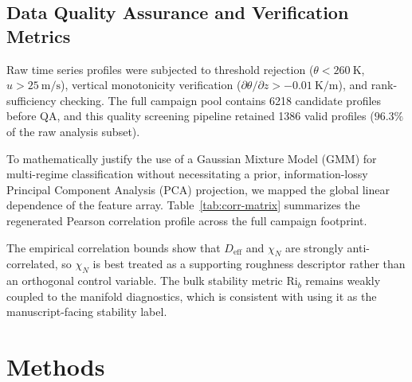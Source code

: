 \documentclass[11pt,a4paper]{article}
\begin{document}
\subsection{Data Quality Assurance and Verification Metrics}

Raw time series profiles were subjected to threshold rejection ($\theta < \SI{260}{\kelvin}$, $u > \SI{25}{\meter\per\second}$), vertical monotonicity verification ($\partial \theta / \partial z > -\SI{0.01}{\kelvin\per\meter}$), and rank-sufficiency checking. The full campaign pool contains 6218 candidate profiles before QA, and this quality screening pipeline retained 1386 valid profiles ($96.3\%$ of the raw analysis subset).

To mathematically justify the use of a Gaussian Mixture Model (GMM) for multi-regime classification without necessitating a prior, information-lossy Principal Component Analysis (PCA) projection, we mapped the global linear dependence of the feature array. Table~\ref{tab:corr-matrix} summarizes the regenerated Pearson correlation profile across the full campaign footprint.


The empirical correlation bounds show that $D_{\mathrm{eff}}$ and $\chi_N$ are strongly anti-correlated, so $\chi_N$ is best treated as a supporting roughness descriptor rather than an orthogonal control variable. The bulk stability metric $\mathrm{Ri}_b$ remains weakly coupled to the manifold diagnostics, which is consistent with using it as the manuscript-facing stability label.

 \section{Methods}
\label{sec:methods}
\end{document}

